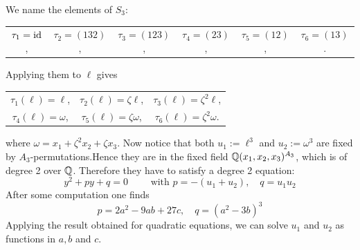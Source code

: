 \documentclass[twoside = false,	%
		headsepline,		%
		parskip = true,
		]{scrbook}						%
\begin{document}
            
            We name the elements of $S_3$:
            \begin{center}
            \begin{tabular}{cccccc}
            $\tau_1=\mathrm{id}$,& $\tau_2=(132)$, &$\tau_3=(123)$, &$\tau_4=(23)$, &$\tau_5=(12)$, &$\tau_6=(13)$.
            \end{tabular}
            \end{center}
            Applying them to $\ell$ gives 
            \begin{center}
            \begin{tabular}{ccc}
            $\tau_1(\ell)=\ell$,& $\tau_2(\ell)=\zeta\ell$, &$\tau_3(\ell)=\zeta^2\ell$, \\
            $\tau_4(\ell)=\omega$, &$\tau_5(\ell)=\zeta\omega$, &$\tau_6(\ell)=\zeta^2\omega$.
            \end{tabular}
            \end{center}
            where $\omega=x_1+\zeta^2x_2+\zeta x_3$. Now notice that both $u_1:=\ell^3$ and $u_2:=\omega^3$ are fixed by $A_3$-permutations.Hence they are in the fixed field $\mathbb Q(x_1,x_2,x_3)^{A_3}$, which is of degree 2 over $\mathbb Q$. Therefore they have to satisfy a degree 2 equation:
            $$y^2+py+q=0 \qquad \text{ with } p=-(u_1+u_2),\quad q=u_1u_2$$
            After some computation one finds
            $$p=2a^2-9ab+27c, \quad q=(a^2-3b)^3$$
            Applying the result obtained for quadratic equations, we can solve $u_1$ and $u_2$ as functions in $a,b$ and $c$.
            
\end{document}
